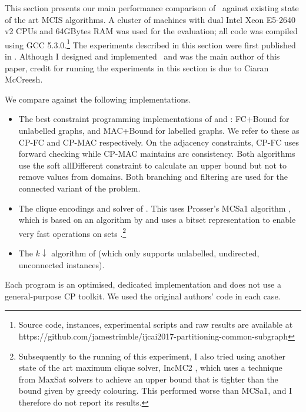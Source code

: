 This section presents our main performance comparison of \McSplit\ against
existing state of the art MCIS algorithms.
A cluster of machines with dual Intel Xeon E5-2640 v2 CPUs and
64GBytes RAM was used for the evaluation; all code was compiled
using GCC 5.3.0.\footnote{Source code, instances, experimental scripts and raw
results are available at
https://github.com/jamestrimble/ijcai2017-partitioning-common-subgraph}
The experiments described in this section were first published in
\citet{DBLP:conf/ijcai/McCreeshPT17}.  Although I designed and implemented
\McSplit\ and was the main author of this paper, credit for running
the experiments in this section is due to Ciaran McCreesh.

We compare against the following implementations.

\begin{itemize}
\item The best constraint
programming implementations of \citet{DBLP:conf/cp/NdiayeS11} and
\citet{DBLP:conf/cp/McCreeshNPS16}:
FC+Bound for unlabelled graphs,
and MAC+Bound for labelled graphs.  We refer to these as CP-FC and
CP-MAC respectively.  On the adjacency constraints, CP-FC uses forward checking
while CP-MAC maintains arc consistency.
Both algorithms use the soft allDifferent constraint to calculate
an upper bound but not to remove values from domains.
Both branching and filtering are used for the connected variant of
the problem.
\item The clique encodings and solver of \citet{DBLP:conf/cp/McCreeshNPS16}.
This uses Prosser's MCSa1 algorithm \citep{DBLP:journals/algorithms/Prosser12}, which is
based on an algorithm by \citet{DBLP:journals/ieicet/TomitaSHW13} and uses a
bitset representation to enable very fast operations on sets
\citep{DBLP:journals/cor/SegundoRJ11}.\footnote{
Subsequently to the running of this experiment,
I also tried using another state of the
art maximum clique solver, IncMC2 \citep{DBLP:journals/informs/LiFJX18}, which
uses a technique from MaxSat solvers to achieve an upper bound that is tighter
than the bound given by greedy colouring.
This performed worse than MCSa1, and I therefore do not report its
results.}
\item The
$k{\downarrow}$ algorithm of \citet{UpcomingAAAIPaper} (which only supports
unlabelled, undirected, unconnected instances).
\end{itemize}

Each
program is an optimised, dedicated implementation and does not use a
general-purpose CP toolkit.  We used the original authors'
code in each case.







